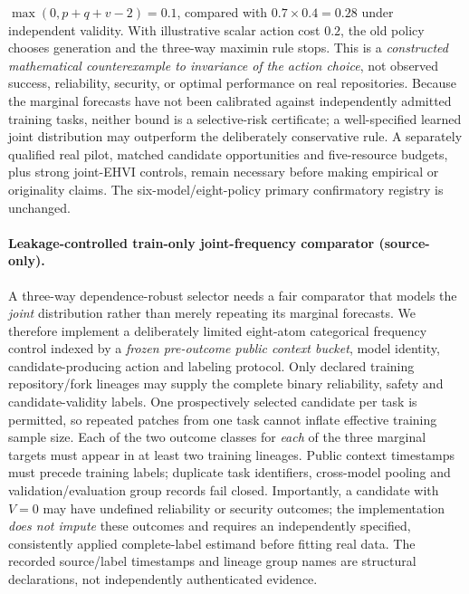 \documentclass[pdflatex,sn-basic]{sn-jnl}
\begin{document}
$\max(0,p+q+v-2)=0.1$, compared with $0.7\times0.4=0.28$
under independent validity. With illustrative scalar action
cost $0.2$, the old policy chooses generation and the three-way
maximin rule stops. This is a \emph{constructed mathematical
counterexample to invariance of the action choice}, not observed
success, reliability, security, or optimal performance on real
repositories. Because the marginal forecasts have not been calibrated
against independently admitted training tasks, neither bound is a
selective-risk certificate; a well-specified learned joint
distribution may outperform the deliberately conservative rule.
A separately qualified real pilot, matched candidate opportunities
and five-resource budgets, plus strong joint-EHVI controls, remain
necessary before making empirical or originality claims.
The six-model/eight-policy primary confirmatory registry is unchanged.


\paragraph{Leakage-controlled train-only joint-frequency comparator (source-only).}
A three-way dependence-robust selector needs a fair comparator that
models the \emph{joint} distribution rather than merely repeating
its marginal forecasts. We therefore implement a deliberately limited
eight-atom categorical frequency control indexed by a \emph{frozen
pre-outcome public context bucket}, model identity, candidate-producing
action and labeling protocol. Only declared training repository/fork
lineages may supply the complete binary reliability, safety and
candidate-validity labels. One prospectively selected candidate per
task is permitted, so repeated patches from one task cannot inflate
effective training sample size. Each of the two outcome classes for
\emph{each} of the three marginal targets must appear in at least
two training lineages. Public context timestamps must precede training
labels; duplicate task identifiers, cross-model pooling and
validation/evaluation group records fail closed.
Importantly, a candidate with $V=0$ may have undefined reliability
or security outcomes; the implementation \emph{does not impute}
these outcomes and requires an independently specified, consistently
applied complete-label estimand before fitting real data.
The recorded source/label timestamps and lineage group names are
structural declarations, not independently authenticated evidence.
\end{document}

